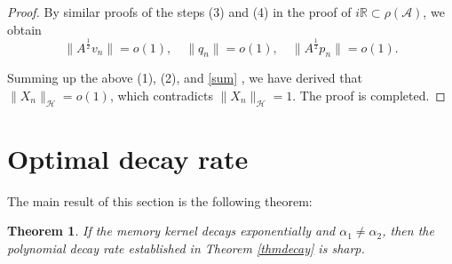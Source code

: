 \documentclass[12pt,reqno]{article}
\newtheorem{theorem}{Theorem}[section] %
\let\Section=\section
\def\section{\setcounter{equation}{0}\Section}
\begin{document}
\begin{proof}
By similar proofs of the steps (3) and (4) in the proof of $i\mathbb{R}\subset\rho(\mathcal{A})$, we obtain
		\begin{equation}\label{sum}
			\| A^{\frac{1}{2}} v_n \|=o(1), \quad \| q_n \|=o(1), \quad \| A^{\frac{1}{2}} p_n \|=o(1).
		\end{equation}
		
		Summing up the above (1), (2), and \eqref{sum} , we have derived that $\|X_n\|_\mathcal{H}=o(1)$, which contradicts $\|X_n\|_\mathcal{H}= 1$. The proof is completed.
\end{proof}
	\section{Optimal decay rate}\label{sec4}
The main result of this section is the following theorem:
	\begin{theorem}\label{thmoptimaldecay}
If the memory kernel decays exponentially and $\alpha_1\neq\alpha_2$, then the polynomial decay rate established in Theorem \ref{thmdecay} is sharp.
\end{theorem}
\end{document}
